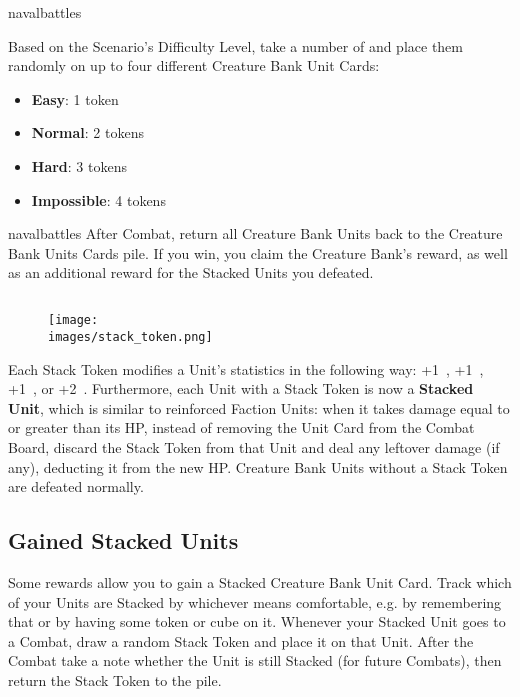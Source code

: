 \begin{expansion}[before=\vspace*{-11mm}]{navalbattles}
\begin{multicols*}{2}
  Based on the Scenario's Difficulty Level, take a number of  and place them randomly on up to four different Creature Bank Unit Cards:
  \begin{itemize}
    \item \textbf{Easy}: 1 token
    \item \textbf{Normal}: 2 tokens
    \item \textbf{Hard}: 3 tokens
    \item \textbf{Impossible}: 4 tokens
  \end{itemize}

  \end{multicols*}
\end{expansion}

\begin{multicols*}{2}
\begin{expansion}[before=\vspace*{-11mm}]{navalbattles}
  After Combat, return all Creature Bank Units back to the Creature Bank Units Cards pile.
  If you win, you claim the Creature Bank's reward, as well as an additional reward for the Stacked Units you defeated.

  \subsection*{}
  \setlength\intextsep{0pt}
  \setlength\columnsep{1em}
  \begin{wrapfigure}{r}{0.2\linewidth}
    \texttt{[image: \\images/stack\_token.png]}
  \end{wrapfigure}
  Each Stack Token modifies a Unit's statistics in the following way: +1~, +1~, +1~, or +2~.
  Furthermore, each Unit with a Stack Token is now a \textbf{Stacked Unit}, which is similar to reinforced Faction Units: when it takes damage equal to or greater than its HP, instead of removing the Unit Card from the Combat Board, discard the Stack Token from that Unit and deal any leftover damage (if any), deducting it from the new HP.
  Creature Bank Units without a Stack Token are defeated normally.

  \subsection*{Gained Stacked Units}
  Some rewards allow you to gain a Stacked Creature Bank Unit Card.
  Track which of your Units are Stacked by whichever means comfortable, e.g. by remembering that or by having some token or cube on it.
  Whenever your Stacked Unit goes to a Combat, draw a random Stack Token and place it on that Unit.
  After the Combat take a note whether the Unit is still Stacked (for future Combats), then return the Stack Token to the pile.
\end{expansion}


\end{multicols*}
